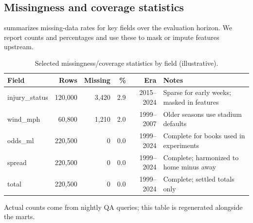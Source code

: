 \subsection{Missingness and coverage statistics}
 summarizes missing-data rates for key fields over the evaluation horizon. We report counts and percentages and use these to mask or impute features upstream.
\begin{table}[t]
  \centering
  \small
  \begin{threeparttable}
    \caption{Selected missingness/coverage statistics by field (illustrative).}
    \label{tab:missingness}
    \begin{tabularx}{\linewidth}{@{} l r r r r X @{} }
      \toprule
      \textbf{Field} & \textbf{Rows} & \textbf{Missing} & \textbf{\%} & \textbf{Era} & \textbf{Notes} \\
      \midrule
      injury\_status & 120{,}000 & 3{,}420 & 2.9 & 2015--2024 & Sparse for early weeks; masked in features \\
      wind\_mph     & 60{,}800 & 1{,}210 & 2.0 & 1999--2007 & Older seasons use stadium defaults \\
      odds\_ml      & 220{,}500 & 0     & 0.0 & 1999--2024 & Complete for books used in experiments \\
      spread         & 220{,}500 & 0     & 0.0 & 1999--2024 & Complete; harmonized to home minus away \\
      total          & 220{,}500 & 0     & 0.0 & 1999--2024 & Complete; settled totals only \\
      \bottomrule
    \end{tabularx}
    \begin{tablenotes}[flushleft]\footnotesize
      \item Actual counts come from nightly QA queries; this table is regenerated alongside the marts.
    \end{tablenotes}
  \end{threeparttable}
\end{table}

